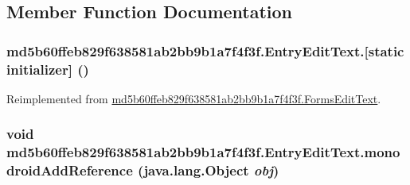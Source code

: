 \subsection{Member Function Documentation}
\hypertarget{classmd5b60ffeb829f638581ab2bb9b1a7f4f3f_1_1_entry_edit_text_1bcb36e7b2e5e9adfbc72e37a3f9a778}{
\subsubsection[{[static initializer]}]{\setlength{\rightskip}{0pt plus 5cm}md5b60ffeb829f638581ab2bb9b1a7f4f3f.EntryEditText.\mbox{[}static initializer\mbox{]} ()}}
\label{classmd5b60ffeb829f638581ab2bb9b1a7f4f3f_1_1_entry_edit_text_1bcb36e7b2e5e9adfbc72e37a3f9a778}




Reimplemented from \hyperlink{classmd5b60ffeb829f638581ab2bb9b1a7f4f3f_1_1_forms_edit_text_ebbff071dc8577936adfdc4ac285f1db}{md5b60ffeb829f638581ab2bb9b1a7f4f3f.FormsEditText}.\hypertarget{classmd5b60ffeb829f638581ab2bb9b1a7f4f3f_1_1_entry_edit_text_7472d6c3ce83f5d2334598037d779849}{
\subsubsection[{monodroidAddReference}]{\setlength{\rightskip}{0pt plus 5cm}void md5b60ffeb829f638581ab2bb9b1a7f4f3f.EntryEditText.monodroidAddReference (java.lang.Object {\em obj})}}
\label{classmd5b60ffeb829f638581ab2bb9b1a7f4f3f_1_1_entry_edit_text_7472d6c3ce83f5d2334598037d779849}





